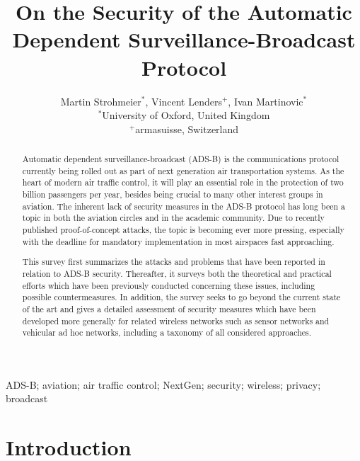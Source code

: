 \documentclass[english]{IEEEtran}
\begin{document}
\title{On the Security of the Automatic Dependent Surveillance-Broadcast
Protocol}


\author{Martin Strohmeier$^{*}$, Vincent Lenders$^{+}$, Ivan Martinovic$^{*}$\\
$^{*}$University of Oxford, United Kingdom\\
$^{+}$armasuisse, Switzerland}
\maketitle
\begin{abstract}
Automatic dependent surveillance-broadcast (ADS-B) is the communications
protocol currently being rolled out as part of next generation air
transportation systems. As the heart of modern air traffic control,
it will play an essential role in the protection of two billion passengers
per year, besides being crucial to many other interest groups in aviation.
The inherent lack of security measures in the ADS-B protocol has long
been a topic in both the aviation circles and in the academic community.
Due to recently published proof-of-concept attacks, the topic is becoming
ever more pressing, especially with the deadline for mandatory implementation
in most airspaces fast approaching. 

This survey first summarizes the attacks and problems that have been
reported in relation to ADS-B security. Thereafter, it surveys both
the theoretical and practical efforts which have been previously conducted
concerning these issues, including possible countermeasures. In addition,
the survey seeks to go beyond the current state of the art and gives
a detailed assessment of security measures which have been developed
more generally for related wireless networks such as sensor networks
and vehicular ad hoc networks, including a taxonomy of all considered
approaches.\end{abstract}
\begin{IEEEkeywords}
ADS-B; aviation; air traffic control; NextGen; security; wireless;
privacy; broadcast
\end{IEEEkeywords}

\section{Introduction}
\end{document}
